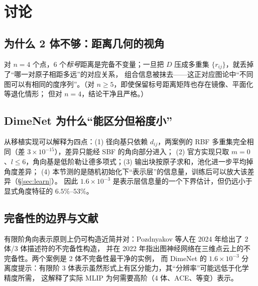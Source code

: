 \documentclass[UTF8,a4paper,11pt]{ctexart}
\begin{document}
\section{讨论}
\label{sec:discuss}

\subsection{为什么 2 体不够：距离几何的视角}
对 $n=4$ 个点，6 个\emph{标号}距离是完备不变量；一旦把 $D$ 压成多重集 $\{r_{ij}\}$，就丢掉了“哪一对原子相距多远”的对应关系，
组合信息被抹去——这正对应图论中“不同图可以有相同的度序列”。（对 $n\ge5$，即使保留标号距离矩阵也存在镜像、平面化等退化情形；
但对 $n=4$，结论干净且严格。）

\subsection{DimeNet 为什么“能区分但裕度小”}
从移植实现可以解释为四点：(1) 径向基只依赖 $d_{ij}$，两案例的 RBF 多重集完全相同（差 $3\times10^{-15}$），差异只能经 SBF 的角向部分进入；
(2) 官方实现只取 $m=0$、$l\le6$，角向基是低阶勒让德多项式；(3) 输出块按原子求和，池化进一步平均掉角度差异；
(4) 本节测的是随机初始化下“表示层”的信息量，训练后可以放大该差异（\S\ref{sec:learn}）。
因此 $1.6\times10^{-3}$ 是表示层信息量的一个下界估计，但仍远小于显式角度特征的 $6.5\%$--$53\%$。

\subsection{完备性的边界与文献}
有限阶角向表示原则上仍可构造近简并对：Pozdnyakov 等人在 2024 年给出了 2 体/3 体描述符的不完备性构造\cite{pozd2024}，
并在 2022 年指出图神经网络在三维点云上的不完备性\cite{pozd2022}。两个案例是 2 体不完备性最干净的实例，
而 DimeNet 的 $1.6\times10^{-3}$ 分离度提示：有限阶 3 体表示虽然形式上有区分能力，其“分辨率”可能远低于化学精度所需，
这解释了实际 MLIP 为何需要高阶（4 体、ACE、等变）表示。

\end{document}
